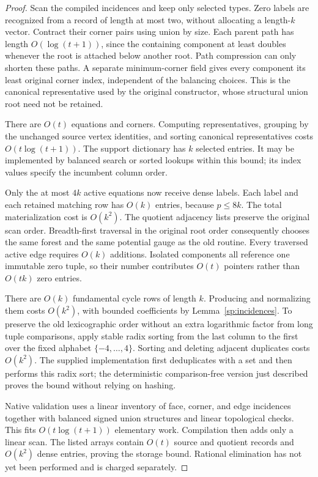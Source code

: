 \begin{proof}
Scan the compiled incidences and keep only selected types.  Zero
labels are recognized from a record of length at most two, without
allocating a length-\(k\) vector.  Contract their corner pairs using
union by size.  Each parent path has length \(O(\log(t+1))\), since
the containing component at least doubles whenever the root is
attached below another root.  Path compression can only shorten
these paths.  A separate minimum-corner field gives every component
its least original corner index, independent of the balancing
choices.  This is the canonical representative used by the original
constructor, whose structural union root need not be retained.

There are \(O(t)\) equations and corners.  Computing representatives,
grouping by the unchanged source vertex identities, and sorting
canonical representatives costs \(O(t\log(t+1))\).  The support
dictionary has \(k\) selected entries.  It may be implemented by
balanced search or sorted lookups within this bound; its index values
specify the incumbent column order.

Only the at most \(4k\) active equations now receive dense labels.
Each label and each retained matching row has \(O(k)\) entries,
because \(p\le8k\).  The total materialization cost is \(O(k^2)\).
The quotient adjacency lists preserve the original scan order.
Breadth-first traversal in the original root order consequently
chooses the same forest and the same potential gauge as the old
routine.  Every traversed active edge requires \(O(k)\) additions.
Isolated components all reference one immutable zero tuple, so their
number contributes \(O(t)\) pointers rather than \(O(tk)\) zero
entries.

There are \(O(k)\) fundamental cycle rows of length \(k\).
Producing and normalizing them costs \(O(k^2)\), with bounded
coefficients by Lemma~\ref{sp:incidences}.  To preserve the old
lexicographic order without an extra logarithmic factor from long
tuple comparisons, apply stable radix sorting from the last column
to the first over the fixed alphabet \(\{-4,\ldots,4\}\).
Sorting and deleting adjacent duplicates costs \(O(k^2)\).
The supplied implementation first deduplicates with a set and then
performs this radix sort; the deterministic comparison-free version
just described proves the bound without relying on hashing.

Native validation uses a linear inventory of face, corner, and edge
incidences together with balanced signed union structures and linear
topological checks.  This fits \(O(t\log(t+1))\) elementary work.
Compilation then adds only a linear scan.  The listed arrays contain
\(O(t)\) source and quotient records and \(O(k^2)\) dense entries,
proving the storage bound.  Rational elimination has not yet been
performed and is charged separately.
\end{proof}

